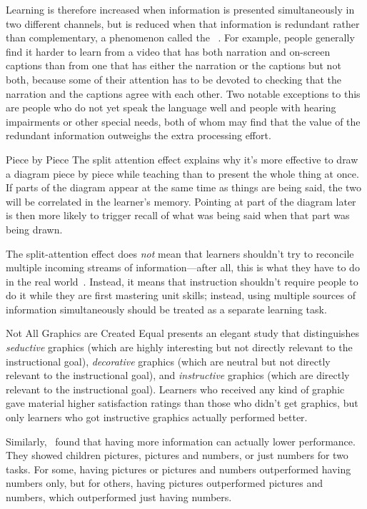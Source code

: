 Learning is therefore increased when information is presented simultaneously in two different channels,
but is reduced when that information is redundant rather than complementary,
a phenomenon called the ~\cite{Maye2003}.
For example,
people generally find it harder to learn from a video that has both narration and on-screen captions
than from one that has either the narration or the captions but not both,
because some of their attention has to be devoted to checking
that the narration and the captions agree with each other.
Two notable exceptions to this are people who do not yet speak the language well
and people with hearing impairments or other special needs,
both of whom may find that the value of the redundant information
outweighs the extra processing effort.

\begin{aside}{Piece by Piece}
  The split attention effect explains why
  it's more effective to draw a diagram piece by piece while teaching
  than to present the whole thing at once.
  If parts of the diagram appear at the same time as things are being said,
  the two will be correlated in the learner's memory.
  Pointing at part of the diagram later
  is then more likely to trigger recall of what was being said when that part was being drawn.
\end{aside}

The split-attention effect does \emph{not} mean
that learners shouldn't try to reconcile multiple incoming streams of information---after all,
this is what they have to do in the real world~\cite{Atki2000}.
Instead,
it means that instruction shouldn't require people to do it
while they are first mastering unit skills;
instead,
using multiple sources of information simultaneously should be treated as a separate learning task.

\begin{aside}{Not All Graphics are Created Equal}
  \cite{Sung2012} presents an elegant study that distinguishes \emph{seductive} graphics
  (which are highly interesting but not directly relevant to the instructional goal),
  \emph{decorative} graphics
  (which are neutral but not directly relevant to the instructional goal),
  and \emph{instructive} graphics
  (which are directly relevant to the instructional goal).
  Learners who received any kind of graphic gave material higher satisfaction ratings
  than those who didn't get graphics,
  but only learners who got instructive graphics actually performed better.

  Similarly,~\cite{Stam2013,Stam2014} found that
  having more information can actually lower performance.
  They showed children pictures, pictures and numbers, or just numbers for two tasks.
  For some,
  having pictures or pictures and numbers outperformed having numbers only,
  but for others,
  having pictures outperformed pictures and numbers,
  which outperformed just having numbers.
\end{aside}

